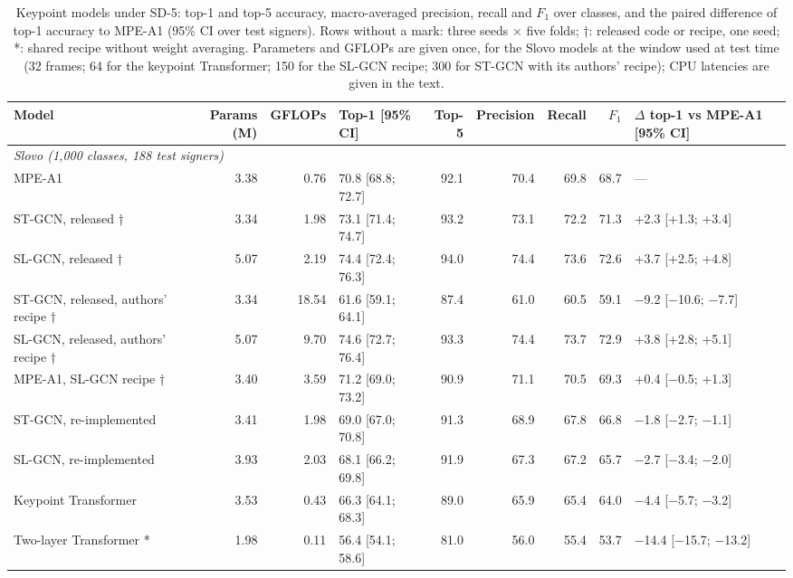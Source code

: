 \begin{table}[t]
\caption{Keypoint models under SD-5: top-1 and top-5 accuracy, macro-averaged precision, recall and $F_1$ over classes, and the paired difference of top-1 accuracy to MPE-A1 (95\% CI over test signers). Rows without a mark: three seeds × five folds; †: released code or recipe, one seed; *: shared recipe without weight averaging. Parameters and GFLOPs are given once, for the Slovo models at the window used at test time (32 frames; 64 for the keypoint Transformer; 150 for the SL-GCN recipe; 300 for ST-GCN with its authors' recipe); CPU latencies are given in the text.}\label{tab:rsl_main}
\scriptsize\setlength{\tabcolsep}{3pt}
\centering
\begin{tabular}{lrrlrrrrl}
\toprule
\textbf{Model} & \textbf{Params (M)} & \textbf{GFLOPs} & \textbf{Top-1 [95\% CI]} & \textbf{Top-5} & \textbf{Precision} & \textbf{Recall} & \textbf{$F_1$} & \textbf{$\Delta$ top-1 vs MPE-A1 [95\% CI]} \\
\midrule
\multicolumn{9}{l}{\textit{Slovo (1,000 classes, 188 test signers)}} \\
MPE-A1 & 3.38 & 0.76 & 70.8 [68.8; 72.7] & 92.1 & 70.4 & 69.8 & 68.7 & --- \\
ST-GCN, released † & 3.34 & 1.98 & 73.1 [71.4; 74.7] & 93.2 & 73.1 & 72.2 & 71.3 & +2.3 [+1.3; +3.4] \\
SL-GCN, released † & 5.07 & 2.19 & 74.4 [72.4; 76.3] & 94.0 & 74.4 & 73.6 & 72.6 & +3.7 [+2.5; +4.8] \\
ST-GCN, released, authors' recipe † & 3.34 & 18.54 & 61.6 [59.1; 64.1] & 87.4 & 61.0 & 60.5 & 59.1 & −9.2 [−10.6; −7.7] \\
SL-GCN, released, authors' recipe † & 5.07 & 9.70 & 74.6 [72.7; 76.4] & 93.3 & 74.4 & 73.7 & 72.9 & +3.8 [+2.8; +5.1] \\
MPE-A1, SL-GCN recipe † & 3.40 & 3.59 & 71.2 [69.0; 73.2] & 90.9 & 71.1 & 70.5 & 69.3 & +0.4 [−0.5; +1.3] \\
ST-GCN, re-implemented & 3.41 & 1.98 & 69.0 [67.0; 70.8] & 91.3 & 68.9 & 67.8 & 66.8 & −1.8 [−2.7; −1.1] \\
SL-GCN, re-implemented & 3.93 & 2.03 & 68.1 [66.2; 69.8] & 91.9 & 67.3 & 67.2 & 65.7 & −2.7 [−3.4; −2.0] \\
Keypoint Transformer & 3.53 & 0.43 & 66.3 [64.1; 68.3] & 89.0 & 65.9 & 65.4 & 64.0 & −4.4 [−5.7; −3.2] \\
Two-layer Transformer * & 1.98 & 0.11 & 56.4 [54.1; 58.6] & 81.0 & 56.0 & 55.4 & 53.7 & −14.4 [−15.7; −13.2] \\

\end{tabular}
\end{table}
